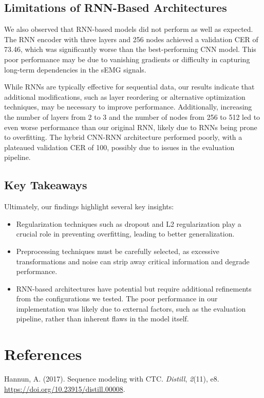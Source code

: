 \documentclass{article}
\begin{document}
\subsection{Limitations of RNN-Based Architectures}
We also observed that RNN-based models did not perform as well as expected. The RNN encoder with three layers and 256 nodes achieved a validation CER of 73.46, which was significantly worse than the best-performing CNN model. This poor performance may be due to vanishing gradients or difficulty in capturing long-term dependencies in the sEMG signals.

While RNNs are typically effective for sequential data, our results indicate that additional modifications, such as layer reordering or alternative optimization techniques, may be necessary to improve performance. Additionally, increasing the number of layers from 2 to 3 and the number of nodes from 256 to 512 led to even worse performance than our original RNN, likely due to RNNs being prone to overfitting. The hybrid CNN-RNN architecture performed poorly, with a plateaued validation CER of 100, possibly due to issues in the evaluation pipeline.

\subsection{Key Takeaways}
Ultimately, our findings highlight several key insights:
\begin{itemize}
    \item Regularization techniques such as dropout and L2 regularization play a crucial role in preventing overfitting, leading to better generalization.
    \item Preprocessing techniques must be carefully selected, as excessive transformations and noise can strip away critical information and degrade performance.
    \item RNN-based architectures have potential but require additional refinements from the configurations we tested. The poor performance in our implementation was likely due to external factors, such as the evaluation pipeline, rather than inherent flaws in the model itself.
\end{itemize}


\section{References}
Hannun, A. (2017). Sequence modeling with CTC. \textit{Distill}, \textit{2}(11), e8. 
\url{https://doi.org/10.23915/distill.00008}.
\end{document}
